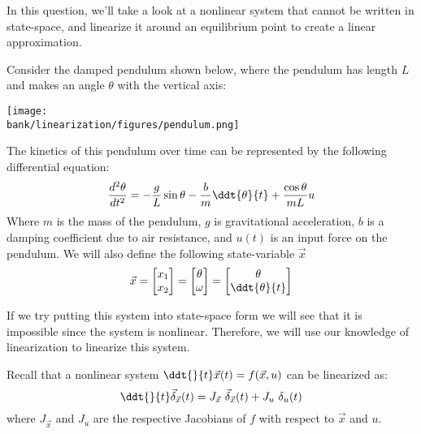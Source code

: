 
In this question, we'll take a look at a nonlinear system that cannot be written in state-space, and linearize it around an equilibrium point to create a linear approximation.

Consider the damped pendulum shown below, where the pendulum has length $L$ and makes an angle $\theta$ with the vertical axis:
\begin{center}
\texttt{[image: \\bank/linearization/figures/pendulum.png]}
\end{center}
The kinetics of this pendulum over time can be represented by the following differential equation:
\begin{equation}
  \frac{d^{2} \theta}{dt^{2}} = -\frac{g}{L} \sin \theta - \frac{b}{m} \ddt{\theta}{t} + \frac{\cos \theta}{mL} u
\end{equation}
Where $m$ is the mass of the pendulum, $g$ is gravitational acceleration, $b$ is a damping coefficient due to air resistance, and $u(t)$ is an input force on the pendulum. We will also define the following state-variable $\vec{x}$
\begin{equation*}
  \vec{x} = \begin{bmatrix} x_{1} \\ x_{2} \end{bmatrix} = \begin{bmatrix} \theta \\ \omega \end{bmatrix} = \begin{bmatrix} \theta \\ \ddt{\theta}{t} \end{bmatrix}
\end{equation*}

If we try putting this system into state-space form we will see that it is impossible since the system is nonlinear.
Therefore, we will use our knowledge of linearization to linearize this system.

Recall that a nonlinear system $\ddt{}{t} \vec{x}(t) = f(\vec{x}, u)$ can be linearized as:
\begin{equation}
  \ddt{}{t} \vec{\delta}_{\vec{x}}(t) = J_{\vec{x}} \ \vec{\delta}_{\vec{x}}(t) + J_{u} \ \delta_{u}(t)
\end{equation}
where $J_{\vec{x}}$ and $J_{u}$ are the respective Jacobians of $f$ with respect to $\vec{x}$ and $u.$


